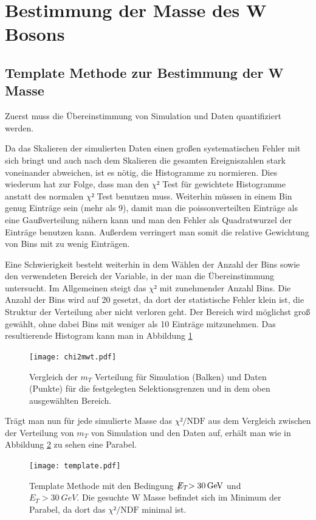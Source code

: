 \documentclass[a4paper,12pt]{article}
\newcommand{\met}{\ensuremath{\not\mathrel{E}}_T}
\begin{document}
\newpage
\section{Bestimmung der Masse des W Bosons}
\subsection{Template Methode zur Bestimmung der W Masse}\label{cap:template}
Zuerst muss die Übereinstimmung von Simulation und Daten quantifiziert werden.

Da das Skalieren der simulierten Daten einen großen systematischen Fehler mit sich bringt und auch nach dem
Skalieren die gesamten Ereigniszahlen stark voneinander abweichen, ist es nötig, die Histogramme zu
normieren. Dies wiederum hat zur Folge, dass man den $χ²$ Test für gewichtete Histogramme anstatt
des normalen $χ²$ Test benutzen
muss\cite{cramer1999mathematical}.
Weiterhin müssen in einem Bin genug
Einträge sein (mehr als 9), damit man die poissonverteilten Einträge als eine Gaußverteilung nähern kann 
und man den Fehler als Quadratwurzel der Einträge benutzen kann. Außerdem verringert man
somit die relative Gewichtung von Bins mit zu wenig Einträgen.



Eine Schwierigkeit besteht weiterhin in dem Wählen der Anzahl der Bins sowie den verwendeten
Bereich der Variable, in der man die Übereinstimmung untersucht. Im Allgemeinen steigt das $χ²$ mit zunehmender Anzahl Bins. Die Anzahl der Bins wird auf
20 gesetzt, da dort der statistische Fehler klein ist, die Struktur der Verteilung aber nicht
verloren geht. Der Bereich wird möglichst groß gewählt, ohne dabei Bins mit weniger als 10 Einträge
mitzunehmen. Das resultierende Histogram kann man in Abbildung \ref{fig:compareHistoMT}

\begin{figure}[htb]
	\centering
	\texttt{[image: chi2mwt.pdf]}
	\caption{Vergleich der $m_T$ Verteilung für Simulation (Balken) und Daten (Punkte) für die
		festgelegten Selektionsgrenzen und in dem oben ausgewählten Bereich.}
	\label{fig:compareHistoMT}
\end{figure}


Trägt man nun für jede simulierte Masse das $χ²/\text{NDF}$ aus dem Vergleich zwischen der
Verteilung von $m_T$ von
Simulation und den Daten auf, erhält man wie in Abbildung \ref{fig:template} zu sehen eine Parabel.

\begin{figure}[htb]
	\centering
	\texttt{[image: template.pdf]}
	\caption{Template Methode mit den Bedingung $\met > \SI{30}{GeV}$ und $E_{T} > \SI{30}{GeV}$. Die gesuchte W Masse befindet sich im Minimum der Parabel, da dort
		das $χ²/\text{NDF}$ minimal ist.}
	\label{fig:template}
\end{figure}
\end{document}
